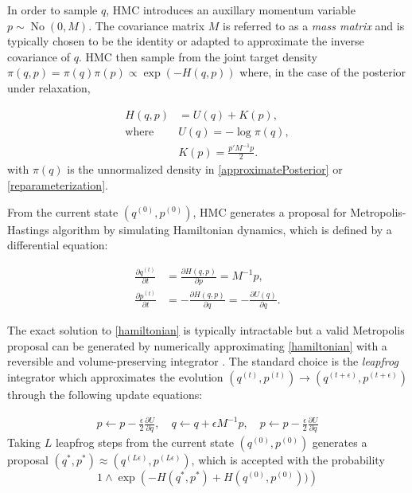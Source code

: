 \documentclass[10pt,fleqn]{article}
\newcommand{\mc}[1]{\mathcal{#1}}
\DeclareMathOperator{\No}{No}
\DeclareMathOperator{\1}{\mathbbm{1}}
\newcommand{\dt}{\epsilon} %
\newcommand{\mass}{M} %
\begin{document}
In order to sample $q$, HMC introduces an auxillary momentum variable $p \sim \No(0, \mass)$. The covariance matrix $\mass$ is referred to as a \textit{mass matrix} and is typically chosen to be the identity or adapted to approximate the inverse covariance of $q$. HMC then sample from the joint target density $\pi(q, p) = \pi(q) \pi(p) \propto \exp (- H(q, p))$ where, in the case of the posterior under relaxation, 


\begin{equation}
\begin{aligned}
H(q, p)& = U(q)+K(p),\\
\text{where } & U(q) = -\log\pi(q),\\
& K(p) = \frac{p'\mass^{-1} p}{2}.
\end{aligned}
\end{equation}
with $\pi(q)$ is the unnormalized density in \eqref{approximatePosterior} or \eqref{reparameterization}. %

From the current state $(q^{(0)},p^{(0)})$, HMC generates a proposal for Metropolis-Hastings algorithm by simulating Hamiltonian dynamics, which is defined by a differential equation:

\begin{equation}
\begin{aligned}
\label{hamiltonian}
\frac{\partial q ^{(t)}}{\partial t} & =\frac{\partial H(q, p)}{\partial p} = \mass^{-1}p,\\
\frac{\partial p^{(t)}}{\partial t}& =-\frac{\partial H(q, p)}{\partial q} = -\frac{\partial U(q)}{\partial q}.
\end{aligned}
\end{equation}

The exact solution to \eqref{hamiltonian} is typically intractable but a valid Metropolis proposal can be generated by numerically approximating \eqref{hamiltonian} with a reversible and volume-preserving  integrator \citep{neal2011mcmc}. The standard choice is the \textit{leapfrog} integrator which approximates the evolution $(q^{(t)},p^{(t)}) \to (q^{(t + \dt)},p^{(t + \dt)})$ through the following update equations:

\begin{equation}
\begin{aligned}
\label{leap-frog}
p \leftarrow p - \frac{\dt}{2} \frac{\partial U}{\partial  q },\quad
q \leftarrow  q  + \dt \mass^{-1}p,\quad
p \leftarrow p -  \frac{\dt}{2}  \frac{\partial U}{\partial  q } 
\end{aligned}
\end{equation}
Taking $L$ leapfrog steps from the current state $(q^{(0)},p^{(0)})$ generates a proposal $(q^{*},p^{*}) \approx (q^{(L \dt)},p^{(L \dt)})$, which is accepted with the probability 
$$1\wedge \exp  \left( - H(q^{*},p^{*}) + H(q^{(0)},p^{(0)}))\right)$$
\end{document}
